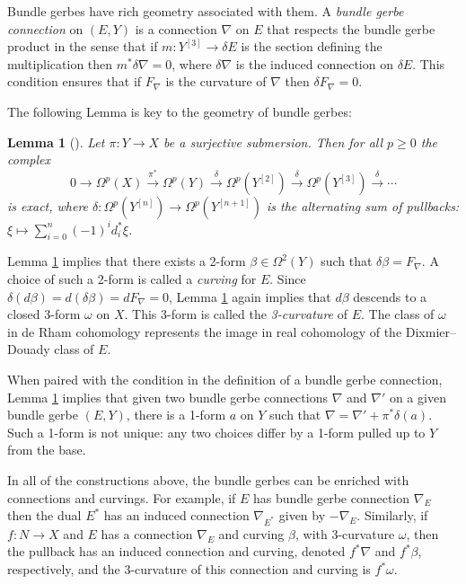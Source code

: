 \documentclass[12pt]{amsart}
\theoremstyle{plain}
\newtheorem{lemma}[theorem]{Lemma}
\theoremstyle{definition}
\theoremstyle{remark}
\numberwithin{equation}{section}
\renewcommand{\b}{\beta}
\renewcommand{\d}{\delta}
\newcommand{\<}{\langle}
\renewcommand{\>}{\rangle}
\begin{document}
Bundle gerbes have rich geometry associated with them. A \emph{bundle gerbe connection} on $(E,Y)$ is a connection $\nabla$ on $E$ that respects the bundle gerbe product in the sense that if $m \colon Y^{[3]} \to \d E$ is the section defining the multiplication then $m^* \d \nabla = 0$, where $\d \nabla$ is the induced connection on $\d E$. This condition ensures that if $F_\nabla$ is the curvature of $\nabla$ then $ \d F_{\nabla} = 0$. 

The following Lemma is key to the geometry of bundle gerbes:

\begin{lemma}[\cite{Mur}]\label{lemma:key}
\label{lemma:fund_lemma}
Let $\pi\colon Y\to X$ be a surjective submersion. Then for all $p\geq 0$ the complex
\[
  0 \to \Omega^p(X)\xrightarrow{\pi^*} \Omega^p(Y) \xrightarrow{\delta} \Omega^p(Y^{[2]}) \xrightarrow{\delta} \Omega^p(Y^{[3]}) \xrightarrow{\delta} \cdots
\]
is exact, where $\delta\colon \Omega^p(Y^{[n]}) \to \Omega^p(Y^{[n+1]})$ is the alternating sum of pullbacks: $\xi\mapsto \sum_{i=0}^n (-1)^i d_i^*\xi$.
\end{lemma}

Lemma \ref{lemma:key} implies that there exists a 2-form $\beta \in \Omega^2(Y)$ such that $\d \beta = F_{\nabla}$. 
A choice of such a 2-form is called a \emph{curving} for $E$. 
Since $\d (d \beta) = d(\d \b) = dF_{\nabla} = 0$, Lemma \ref{lemma:key} again implies that $d \b$ descends to a closed 3-form $\omega$ on $X$. 
This 3-form is called the \emph{3-curvature} of $E$. 
The class of $\omega$ in de Rham cohomology represents the image in real cohomology of the Dixmier--Douady class of $E$.


When paired with the condition in the definition of a bundle gerbe connection, Lemma \ref{lemma:key} implies that given two bundle gerbe connections $\nabla$ and $\nabla'$ on a given bundle gerbe $(E,Y)$, there is a 1-form $a$ on $Y$ such that $\nabla = \nabla' + \pi^*\delta(a)$. 
Such a 1-form is not unique: any two choices differ by a 1-form pulled up to $Y$ from the base.


In all of the constructions above, the bundle gerbes can be enriched with connections and curvings. For example, if $E$ has bundle gerbe connection $\nabla_E$ then the dual $E^*$ has an induced connection $\nabla_{E^*}$ given by $-\nabla_E$. Similarly, if $f \colon N \to X$ and $E$ has a connection $\nabla_E$ and curving $\beta$, with 3-curvature $\omega$, then the pullback has an induced connection and curving, denoted $f^*\nabla$ and $f^*\beta $, respectively, and the 3-curvature of this connection and curving is $f^* \omega$.
\end{document}
